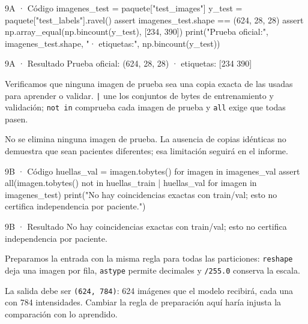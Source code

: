 \begin{Codigo}{9A · Código}
imagenes_test = paquete["test_images"]
y_test = paquete["test_labels"].ravel()
assert imagenes_test.shape == (624, 28, 28)
assert np.array_equal(np.bincount(y_test), [234, 390])
print("Prueba oficial:", imagenes_test.shape, "· etiquetas:", np.bincount(y_test))
\end{Codigo}

\begin{Salida}{9A · Resultado}
Prueba oficial: (624, 28, 28) · etiquetas: [234 390]
\end{Salida}

\label{paso-9b}

Verificamos que ninguna imagen de prueba sea una copia exacta de las usadas para aprender o validar. \texttt{\small |} une los conjuntos de bytes de entrenamiento y validación; \texttt{\small not in} comprueba cada imagen de prueba y \texttt{\small all} exige que todas pasen.

No se elimina ninguna imagen de prueba. La ausencia de copias idénticas no demuestra que sean pacientes diferentes; esa limitación seguirá en el informe.


\begin{Codigo}{9B · Código}
huellas_val = {imagen.tobytes() for imagen in imagenes_val}
assert all(imagen.tobytes() not in huellas_train | huellas_val for imagen in imagenes_test)
print("No hay coincidencias exactas con train/val; esto no certifica independencia por paciente.")
\end{Codigo}

\begin{Salida}{9B · Resultado}
No hay coincidencias exactas con train/val; esto no certifica independencia por paciente.
\end{Salida}

\label{paso-9c}

Preparamos la entrada con la misma regla para todas las particiones: \texttt{\small reshape} deja una imagen por fila, \texttt{\small astype} permite decimales y \texttt{\small /\allowbreak{}255.\allowbreak{}0} conserva la escala.

La salida debe ser \texttt{\small (\allowbreak{}624,\allowbreak{} 784)\allowbreak{}}: 624 imágenes que el modelo recibirá, cada una con 784 intensidades. Cambiar la regla de preparación aquí haría injusta la comparación con lo aprendido.


